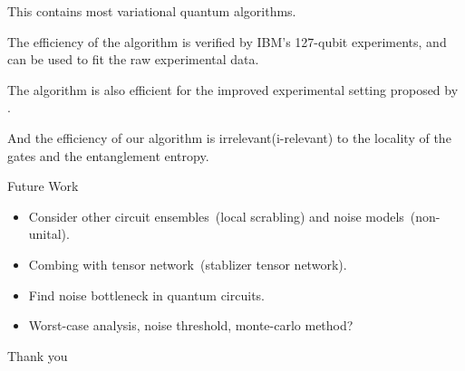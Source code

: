 \documentclass[10pt]{beamer}
\begin{document}
\begin{CJK}{UTF8}{gbsn}
{  This contains most variational quantum algorithms.

  The efficiency of the algorithm is verified by IBM's 127-qubit experiments, and can be used to fit the raw experimental data.

  The algorithm is also efficient for the improved experimental setting proposed by \cite{anand2023classical}.

  And the efficiency of our algorithm is irrelevant(i-relevant) to the locality of the gates and the entanglement entropy.
}


\begin{frame}[fragile]{Future Work}
  \begin{itemize}
    \item Consider other circuit ensembles~(local scrabling) and noise models~(non-unital).
    \item Combing with tensor network~(stablizer tensor network).
    \item Find noise bottleneck in quantum circuits.
    \item Worst-case analysis, noise threshold, monte-carlo method?
  \end{itemize}
\end{frame}

\begin{frame}[standout]
 Thank you\\
\end{frame}
\note{

}
\end{CJK}
\end{document}
